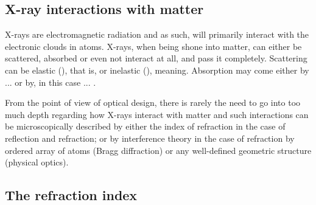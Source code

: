 \begin{refsection}
\section{X-ray interactions with matter}\label{sec:interaction_with_matter}

X-rays are electromagnetic radiation and as such, will primarily interact with the electronic clouds in atoms. X-rays, when being shone into matter, can either be scattered, absorbed or even not interact at all, and pass it completely. Scattering can be elastic (), that is, or inelastic (), meaning. Absorption may come either by ... or by, in this case ... .


From the point of view of optical design, there is rarely the need to go into too much depth regarding how X-rays interact with matter and such interactions can be microscopically described by either the index of refraction in the case of reflection and refraction; or by interference theory in the case of refraction by ordered array of atoms (Bragg diffraction) or any well-defined geometric structure (physical optics).



\subsection{The refraction index}\label{sec:refractive_index}




\end{refsection}
